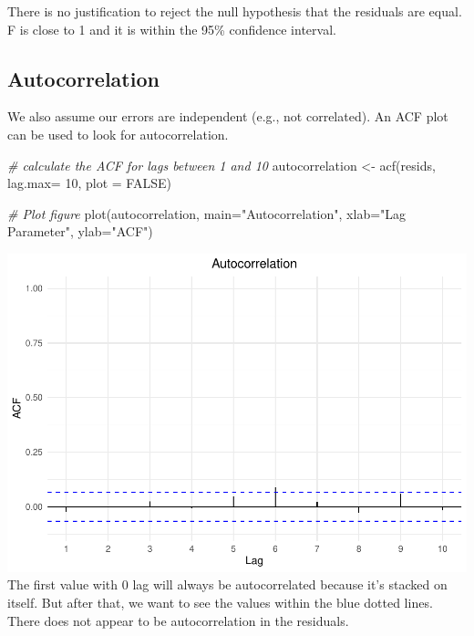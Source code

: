 \documentclass[
]{article}
\newenvironment{Shaded}{\begin{snugshade}}{\end{snugshade}}
\newcommand{\AttributeTok}[1]{\textcolor[rgb]{0.77,0.63,0.00}{#1}}
\newcommand{\CommentTok}[1]{\textcolor[rgb]{0.56,0.35,0.01}{\textit{#1}}}
\newcommand{\ConstantTok}[1]{\textcolor[rgb]{0.00,0.00,0.00}{#1}}
\newcommand{\DecValTok}[1]{\textcolor[rgb]{0.00,0.00,0.81}{#1}}
\newcommand{\FunctionTok}[1]{\textcolor[rgb]{0.00,0.00,0.00}{#1}}
\newcommand{\NormalTok}[1]{#1}
\newcommand{\OtherTok}[1]{\textcolor[rgb]{0.56,0.35,0.01}{#1}}
\newcommand{\StringTok}[1]{\textcolor[rgb]{0.31,0.60,0.02}{#1}}
\begin{document}
There is no justification to reject the null hypothesis that the
residuals are equal. F is close to 1 and it is within the 95\%
confidence interval.

\hypertarget{autocorrelation}{%
\subsection{Autocorrelation}\label{autocorrelation}}

We also assume our errors are independent (e.g., not correlated). An ACF
plot can be used to look for autocorrelation.

\begin{Shaded}
\begin{Highlighting}[]
\CommentTok{\# calculate the ACF for lags between 1 and 10 }
\NormalTok{autocorrelation }\OtherTok{\textless{}{-}} \FunctionTok{acf}\NormalTok{(resids, }\AttributeTok{lag.max=} \DecValTok{10}\NormalTok{, }\AttributeTok{plot =} \ConstantTok{FALSE}\NormalTok{)}

\CommentTok{\# Plot figure}
\FunctionTok{plot}\NormalTok{(autocorrelation,}
     \AttributeTok{main=}\StringTok{"Autocorrelation"}\NormalTok{,}
     \AttributeTok{xlab=}\StringTok{"Lag Parameter"}\NormalTok{,}
     \AttributeTok{ylab=}\StringTok{"ACF"}\NormalTok{)}
\end{Highlighting}
\end{Shaded}

\includegraphics{SCMU_egg_model_files/figure-latex/acf-1.pdf} The first
value with 0 lag will always be autocorrelated because it's stacked on
itself. But after that, we want to see the values within the blue dotted
lines. There does not appear to be autocorrelation in the residuals.
\end{document}
